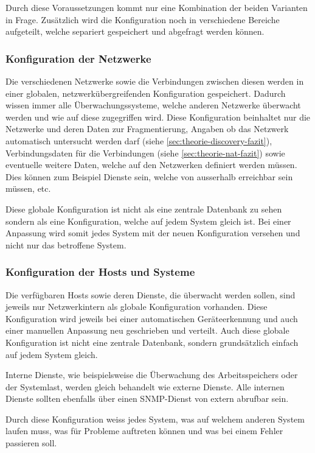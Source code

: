 Durch diese Voraussetzungen kommt nur eine Kombination der beiden Varianten in Frage. Zus\"atzlich wird die Konfiguration noch in verschiedene Bereiche aufgeteilt, welche separiert gespeichert und abgefragt werden k\"onnen.

\subsubsection{Konfiguration der Netzwerke} \label{sec:theorie-config-fazit-network}
Die verschiedenen Netzwerke sowie die Verbindungen zwischen diesen werden in einer globalen, netzwerk\"ubergreifenden Konfiguration gespeichert. Dadurch wissen immer alle \"Uberwachungssysteme, welche anderen Netzwerke \"uberwacht werden und wie auf diese zugegriffen wird. Diese Konfiguration beinhaltet nur die Netzwerke und deren Daten zur Fragmentierung, Angaben ob das Netzwerk automatisch untersucht werden darf (siehe \ref{sec:theorie-discovery-fazit}), Verbindungsdaten f\"ur die Verbindungen (siehe \ref{sec:theorie-nat-fazit}) sowie eventuelle weitere Daten, welche auf den Netzwerken definiert werden m\"ussen. Dies k\"onnen zum Beispiel Dienste sein, welche von ausserhalb erreichbar sein m\"ussen, etc.

Diese globale Konfiguration ist nicht als eine zentrale Datenbank zu sehen sondern als eine Konfiguration, welche auf jedem System gleich ist. Bei einer Anpassung wird somit jedes System mit der neuen Konfiguration versehen und nicht nur das betroffene System.

\subsubsection{Konfiguration der Hosts und Systeme} \label{sec:theorie-config-fazit-systems}
Die verf\"ugbaren Hosts sowie deren Dienste, die \"uberwacht werden sollen, sind jeweils nur Netzwerkintern als globale Konfiguration vorhanden. Diese Konfiguration wird jeweils bei einer automatischen Ger\"ateerkennung und auch einer manuellen Anpassung neu geschrieben und verteilt. Auch diese globale Konfiguration ist nicht eine zentrale Datenbank, sondern grunds\"atzlich einfach auf jedem System gleich.

Interne Dienste, wie beispielsweise die \"Uberwachung des Arbeitsspeichers oder der Systemlast, werden gleich behandelt wie externe Dienste. Alle internen Dienste sollten ebenfalls \"uber einen SNMP-Dienst von extern abrufbar sein.

Durch diese Konfiguration weiss jedes System, was auf welchem anderen System laufen muss, was f\"ur Probleme auftreten k\"onnen und was bei einem Fehler passieren soll.

